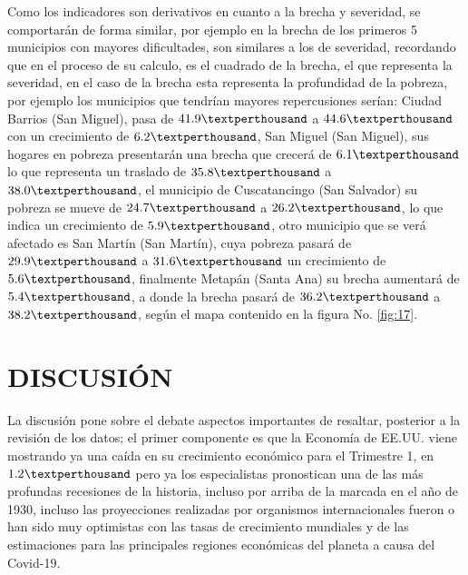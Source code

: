 Como los indicadores son derivativos en cuanto a la brecha y severidad, se comportarán de forma similar, por ejemplo en la brecha de los primeros 5 municipios con mayores dificultades, son similares a los de severidad, recordando que en el proceso de su calculo, es el cuadrado de la brecha, el que representa la severidad, en el caso de la brecha esta representa la profundidad de la pobreza, por ejemplo los municipios que tendrían mayores repercusiones serían:  Ciudad Barrios (San Miguel), pasa de $41.9 \textperthousand$ a $44.6 \textperthousand$ con un crecimiento de $6.2 \textperthousand$, San Miguel (San Miguel), sus hogares en pobreza presentarán una brecha que crecerá de $6.1 \textperthousand$ lo que representa un traslado de $35.8 \textperthousand$ a $38.0 \textperthousand$, el municipio de Cuscatancingo (San Salvador) su pobreza se mueve de $24.7 \textperthousand$ a $26.2 \textperthousand$, lo que indica un crecimiento de $5.9 \textperthousand$, otro municipio que se verá afectado es San Martín (San Martín), cuya pobreza pasará de $29.9 \textperthousand$ a $31.6 \textperthousand$ un crecimiento de $5.6 \textperthousand$, finalmente Metapán (Santa Ana) su brecha aumentará de $5.4 \textperthousand$, a donde la brecha pasará de $36.2 \textperthousand$ a $38.2 \textperthousand$, según el mapa contenido en la figura No. \eqref{fig:17}. \\
  


\section{DISCUSIÓN}
  
La discusión pone sobre el debate aspectos importantes de resaltar, posterior a la revisión de los datos; el primer componente es que la Economía de EE.UU. viene mostrando ya una caída en su crecimiento económico para el Trimestre 1, en $1.2 \textperthousand$ pero ya los especialistas pronostican una de las más profundas recesiones de la historia, incluso por arriba de la marcada en el año de 1930, incluso las proyecciones realizadas por organismos internacionales fueron o han sido muy optimistas con las tasas de crecimiento mundiales y de las estimaciones para las principales regiones económicas del planeta a causa del Covid-19.\\


